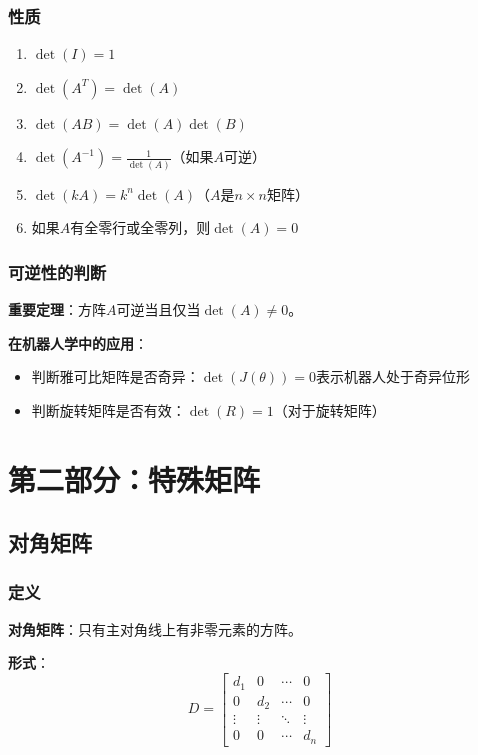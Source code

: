 \documentclass[12pt,a4paper]{article}
\begin{document}
\subsubsection{性质}

\begin{enumerate}
\item $\det(I) = 1$
\item $\det(A^T) = \det(A)$
\item $\det(AB) = \det(A) \det(B)$
\item $\det(A^{-1}) = \frac{1}{\det(A)}$（如果$A$可逆）
\item $\det(kA) = k^n \det(A)$（$A$是$n \times n$矩阵）
\item 如果$A$有全零行或全零列，则$\det(A) = 0$
\end{enumerate}

\subsubsection{可逆性的判断}

\textbf{重要定理}：方阵$A$可逆当且仅当$\det(A) \neq 0$。

\textbf{在机器人学中的应用}：
\begin{itemize}
\item 判断雅可比矩阵是否奇异：$\det(J(\theta)) = 0$表示机器人处于奇异位形
\item 判断旋转矩阵是否有效：$\det(R) = 1$（对于旋转矩阵）
\end{itemize}

\section{第二部分：特殊矩阵}

\subsection{对角矩阵}

\subsubsection{定义}

\textbf{对角矩阵}：只有主对角线上有非零元素的方阵。

\textbf{形式}：
\begin{equation}
D = \begin{bmatrix} d_1 & 0 & \cdots & 0 \\ 0 & d_2 & \cdots & 0 \\ \vdots & \vdots & \ddots & \vdots \\ 0 & 0 & \cdots & d_n \end{bmatrix}
\end{equation}
\end{document}
